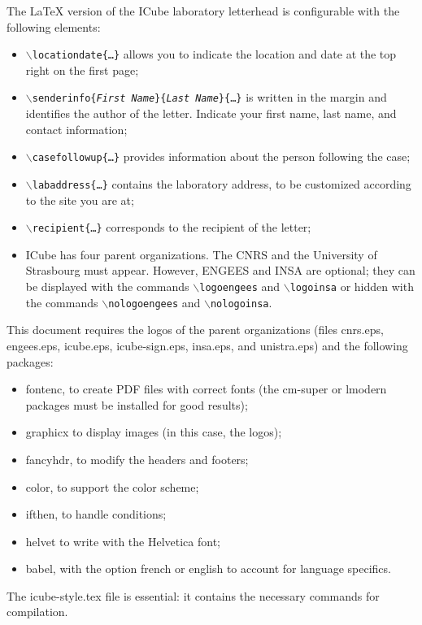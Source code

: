 \documentclass[a4paper,11pt,twosided]{letter}
\begin{document}
The \LaTeX{} version of the ICube laboratory letterhead is configurable with the following elements:
\begin{itemize}
  
  \item \texttt{$\backslash{}$locationdate\{\dots\}} allows you to indicate the location and date at the top right on the first page;

  \item \texttt{$\backslash{}$senderinfo\{\textit{First Name}\}\{\textit{Last Name}\}\{\dots\}} is written in the margin and identifies the author of the letter. Indicate your first name, last name, and contact information;

  \item \texttt{$\backslash{}$casefollowup\{\dots\}} provides information about the person following the case;

  \item \texttt{$\backslash{}$labaddress\{\dots\}} contains the laboratory address, to be customized according to the site you are at;

  \item \texttt{$\backslash{}$recipient\{\dots\}} corresponds to the recipient of the letter;

  \item ICube has four parent organizations. The CNRS and the University of Strasbourg must appear. However, ENGEES and INSA are optional; they can be displayed with the commands \texttt{$\backslash$logoengees} and \texttt{$\backslash$logoinsa} or hidden with the commands \texttt{$\backslash$nologoengees} and \texttt{$\backslash$nologoinsa}.

\end{itemize}

\bigskip

This document requires the logos of the parent organizations (files cnrs.eps, engees.eps, icube.eps, icube-sign.eps, insa.eps, and unistra.eps) and the following packages:
\begin{itemize}
  
  \item fontenc, to create PDF files with correct fonts (the cm-super or lmodern packages must be installed for good results);

  \item graphicx to display images (in this case, the logos);

  \item fancyhdr, to modify the headers and footers;

  \item color, to support the color scheme;

  \item ifthen, to handle conditions;

  \item helvet to write with the Helvetica font;

  \item babel, with the option french or english to account for language specifics.

\end{itemize}
The icube-style.tex file is essential: it contains the necessary commands for compilation.
\end{document}
